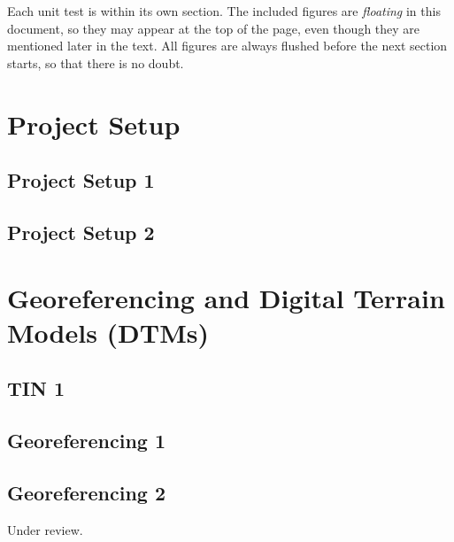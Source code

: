 \documentclass{scrartcl}
\begin{document}
Each unit test is within its own section.
The included figures are \emph{floating} in this document, so they may appear at the top of the page,
 even though they are mentioned later in the text.
All figures are always flushed before the next section starts, so that there is no doubt.

\tableofcontents
\clearpage

\section{Project Setup}

\subsection{Project Setup 1}
\label{sec:project_setup_1}
\clearpage

\subsection{Project Setup 2}
\label{sec:project_setup_2}
\clearpage

\section{Georeferencing and Digital Terrain Models (DTMs)}

\subsection{TIN 1}
\label{sec:tin_1}
\clearpage

\subsection{Georeferencing 1}
\label{sec:georeferencing_1}
\clearpage

\subsection{Georeferencing 2}
\label{sec:georeferencing_2}
Under review.%
\clearpage
\end{document}
